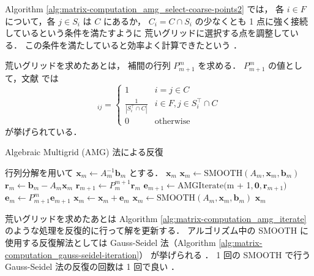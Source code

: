 Algorithm \ref{alg:matrix-computation_amg_select-coarse-points2}
では，
各 $i \in F$ について，各 $j \in S_i$ は $C$ にあるか，
$C_i = C \cap S_i$ の少なくとも 1 点に強く接続しているという条件を満たすように
荒いグリッドに選択する点を調整している．
この条件を満たしていると効率よく計算できたという
\cite{Ruge1987}．

荒いグリッドを求めたあとは，
補間の行列 $P_{m+1}^m$ を求める．
$P_{m+1}^m$ の値として，文献 \cite{Wolters2002} では
\begin{equation}
    [P_{m+1}^m]_{ij} =
    \begin{cases}
        1                                      & i = j \in C                    \\
        \frac{1}{\left|S_i^\top \cap C\right|} & i \in F, j \in S_i^\top \cap C \\
        0                                      & \mathrm{otherwise}
    \end{cases}
\end{equation}
が挙げられている．

\begin{algorithm}[tp]
    \caption{Algebraic Multigrid (AMG) 法による反復 \cite{Wolters2002}}
    \label{alg:matrix-computation_amg_iterate}
    \begin{algorithmic}
        \State 行列分解を用いて $\bm{x}_m \gets A_m^{-1} \bm{b}_m$ とする．
        \State \Return $\bm{x}_m$
        \EndIf
        \State $\bm{x}_m \gets \mathrm{SMOOTH}(A_m, \bm{x}_m, \bm{b}_m)$
        \State $\bm{r}_m \gets \bm{b}_m - A_m \bm{x}_m$
        \State $\bm{r}_{m+1} \gets P_{m}^{m+1} \bm{r}_m$
        \State $\bm{e}_{m+1} \gets \mathrm{AMGIterate}($m + 1$, \bm{0}, \bm{r}_{m+1})$
        \State $\bm{e}_m \gets P_{m+1}^{m} \bm{e}_{m+1}$
        \State $\bm{x}_m \gets \bm{x}_m + \bm{e}_m$
        \State $\bm{x}_m \gets \mathrm{SMOOTH}(A_m, \bm{x}_m, \bm{b}_m)$
        \State \Return $\bm{x}_m$
        \EndProcedure
    \end{algorithmic}
\end{algorithm}

荒いグリッドを求めたあとは
Algorithm \ref{alg:matrix-computation_amg_iterate}
のような処理を反復的に行って解を更新する．
アルゴリズム中の SMOOTH に使用する反復解法としては
Gauss-Seidel 法（Algorithm \ref{alg:matrix-computation_gauss-seidel-iteration}）
が挙げられる
\cite{Ruge1987,Wolters2002}．
1 回の SMOOTH で行う Gauss-Seidel 法の反復の回数は 1 回で良い
\cite{Wolters2002}．

